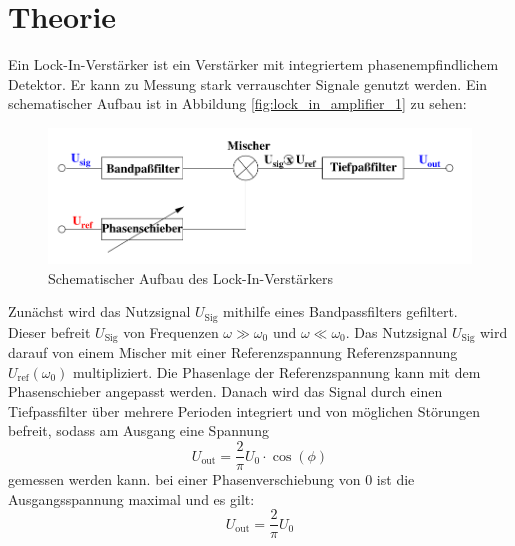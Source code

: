 \section{Theorie}
\label{sec:Theorie}

Ein Lock-In-Verstärker ist ein Verstärker mit integriertem phasenempfindlichem Detektor.
Er kann zu Messung stark verrauschter Signale genutzt werden.
Ein schematischer Aufbau ist in Abbildung \autoref{fig:lock_in_amplifier_1} zu sehen:

\begin{figure}[H]
  \centering
  \includegraphics[scale=0.5]{assets/lock_in_amplifier_1.png}
  \caption{Schematischer Aufbau des Lock-In-Verstärkers \cite{V303}}
  \label{fig:lock_in_amplifier_1}
\end{figure}

\noindent Zunächst wird das Nutzsignal $U_\text{Sig}$ mithilfe eines Bandpassfilters gefiltert.\\
Dieser befreit $U_\text{Sig}$ von Frequenzen $\omega \gg \omega_\text{0}$ und $\omega \ll \omega_\text{0}$.
Das Nutzsignal $U_\text{Sig}$ wird darauf von einem Mischer mit einer Referenzspannung Referenzspannung $U_\text{ref}(\omega_\text{0})$ multipliziert.
Die Phasenlage der Referenzspannung kann mit dem Phasenschieber angepasst werden.
Danach wird das Signal durch einen Tiefpassfilter über mehrere Perioden integriert und von möglichen Störungen befreit, sodass am Ausgang eine Spannung
\begin{equation}
  U_\text{out} = \frac{2}{\pi}U_\text{0}\cdot \cos{\left(\phi\right)}
  \label{eqn:Uout}
\end{equation}
gemessen werden kann.
bei einer Phasenverschiebung von 0 ist die Ausgangsspannung maximal und es gilt:
\begin{equation}
  U_\text{out} = \frac{2}{\pi}U_\text{0}
\end{equation}
